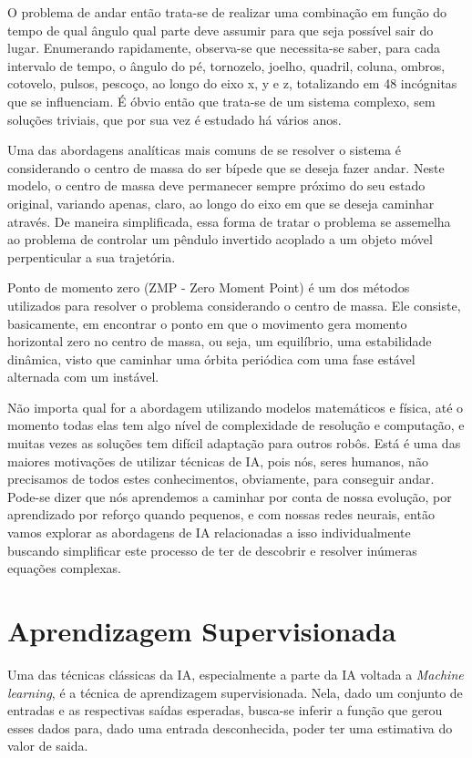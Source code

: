 \documentclass[twoside,conference,a4paper]{IEEEtran}
\begin{document}
O problema de andar então trata-se de realizar uma combinação em função do tempo de qual ângulo qual parte deve assumir para que seja possível sair do lugar. Enumerando rapidamente, observa-se que necessita-se saber, para cada intervalo de tempo, o ângulo do pé, tornozelo, joelho, quadril, coluna, ombros, cotovelo, pulsos, pescoço, ao longo do eixo x, y e z, totalizando em 48 incógnitas que se influenciam. É óbvio então que trata-se de um sistema complexo, sem soluções triviais, que por sua vez é estudado há vários anos.

Uma das abordagens analíticas mais comuns de se resolver o sistema é considerando o centro de massa do ser bípede que se deseja fazer andar. Neste modelo, o centro de massa deve permanecer sempre próximo do seu estado original, variando apenas, claro, ao longo do eixo em que se deseja caminhar através. De maneira simplificada, essa forma de tratar o problema se assemelha ao problema de controlar um pêndulo invertido acoplado a um objeto móvel perpenticular a sua trajetória.

Ponto de momento zero (ZMP - Zero Moment Point) é um dos métodos utilizados para resolver o problema considerando o centro de massa. Ele consiste, basicamente, em encontrar o ponto em que o movimento gera momento horizontal zero no centro de massa, ou seja, um equilíbrio, uma estabilidade dinâmica, visto que caminhar uma órbita periódica com uma fase estável alternada com um instável.

Não importa qual for a abordagem utilizando modelos matemáticos e física, até o momento todas elas tem algo nível de complexidade de resolução e computação, e muitas vezes as soluções tem difícil adaptação para outros robôs. Está é uma das maiores motivações de utilizar técnicas de IA, pois nós, seres humanos, não precisamos de todos estes conhecimentos, obviamente, para conseguir andar. Pode-se dizer que nós aprendemos a caminhar por conta de nossa evolução, por aprendizado por reforço quando pequenos, e com nossas redes neurais, então vamos explorar as abordagens de IA relacionadas a isso individualmente buscando simplificar este processo de ter de descobrir e resolver inúmeras equações complexas.

\section{Aprendizagem Supervisionada} \label{aprendizagem_supervisionada}

Uma das técnicas clássicas da IA, especialmente a parte da IA voltada a \textsl{Machine learning}, é a técnica de aprendizagem supervisionada. Nela, dado um conjunto de entradas e as respectivas saídas esperadas, busca-se inferir a função que gerou esses dados para, dado uma entrada desconhecida, poder ter uma estimativa do valor de saida.
\end{document}
